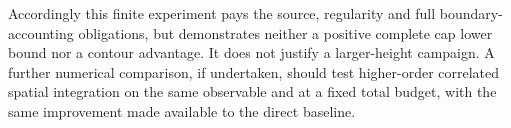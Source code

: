 Accordingly this finite experiment pays the source, regularity and full
boundary-accounting obligations, but demonstrates neither a positive
complete cap lower bound nor a contour advantage.  It does not justify a
larger-height campaign.  A further numerical comparison, if undertaken,
should test higher-order correlated spatial integration on the same
observable and at a fixed total budget, with the same improvement made
available to the direct baseline.
